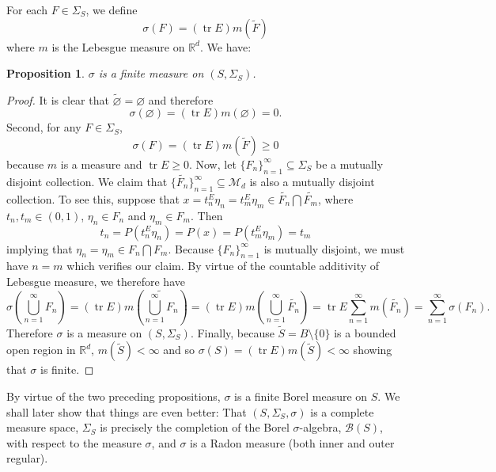 \documentclass[11pt]{article}
\theoremstyle{theorem}
\newtheorem{proposition}[theorem]{Proposition}
\newcommand\tr{\operatorname{tr}}
\begin{document}
\noindent For each $F\in \Sigma_S$, we define
\begin{equation*}
\sigma(F)=(\tr E) m(\widetilde F)
\end{equation*}
where $m$ is the Lebesgue measure on $\mathbb{R}^d$. We have:

\begin{proposition}\label{prop:sigmaisameaure}
$\sigma$ is a finite measure on $(S,\Sigma_S)$.
\end{proposition}
\begin{proof}

\noindent It is clear that $\widetilde{\varnothing}=\varnothing$ and therefore
\begin{equation*}
\sigma(\varnothing)=(\tr E)m(\varnothing)=0.
\end{equation*}
Second, for any $F \in \Sigma_S$, 
\begin{equation*}\sigma(F) = (\tr E) m(\tilde{F}) \geq 0
\end{equation*}
because $m$ is a measure and $\tr E\geq 0$. Now, let $\{ F_n  \}^\infty_{n=1} \subseteq \Sigma_S $ be a mutually disjoint collection. We claim that $\{ \widetilde{F_n} \}_{n=1}^\infty\subseteq\mathcal{M}_d$ is also a mutually disjoint collection. To see this, suppose that $x = t_n^E \eta_n = t_m^E \eta_m\in \widetilde{F_n}\bigcap\widetilde{F_m}$, where $t_n,t_m \in (0,1)$, $\eta_n \in F_n$ and $\eta_m \in F_m $. Then
\begin{equation*}
    t_n = P(t_n^E \eta_n) = P(x) = P(t_m^E \eta_m) = t_m
\end{equation*}
implying that $\eta_n = \eta_m\in F_n\bigcap F_m$. Because $\{F_n\}_{n=1}^\infty$ is mutually disjoint, we must have $n=m$ which verifies our claim. By virtue of the countable additivity of Lebesgue measure, we therefore have
\begin{equation*}
\sigma\left(\bigcup_{n=1}^\infty F_n\right)
    = (\tr E)m\left( \widetilde{\bigcup^\infty_{n=1} F_n } \right)=(\tr E)m\left( \bigcup^\infty_{n=1}\widetilde{F_n} \right)
    = \tr E \sum^\infty_{n=1} m(\widetilde{F_n})
    = \sum^\infty_{n=1}\sigma(F_n).
\end{equation*}
Therefore $\sigma$ is a measure on $(S,\Sigma_S)$. Finally, because $\widetilde{S} = B\setminus\{ 0 \}$ is a bounded open region in $\mathbb{R}^d$, $m(\widetilde{S}) < \infty$ and so $\sigma(S) = (\tr E) m(\widetilde{S}) < \infty$ showing that $\sigma$ is finite.
\end{proof}

By virtue of the two preceding propositions, $\sigma$ is a finite Borel measure on $S$. We shall later show that things are even better: That $(S,\Sigma_S,\sigma)$ is a complete measure space, $\Sigma_S$ is precisely the completion of the Borel $\sigma$-algebra, $\mathcal{B}(S)$, with respect to the measure $\sigma$, and $\sigma$ is a Radon measure (both inner and outer regular). 
\end{document}
